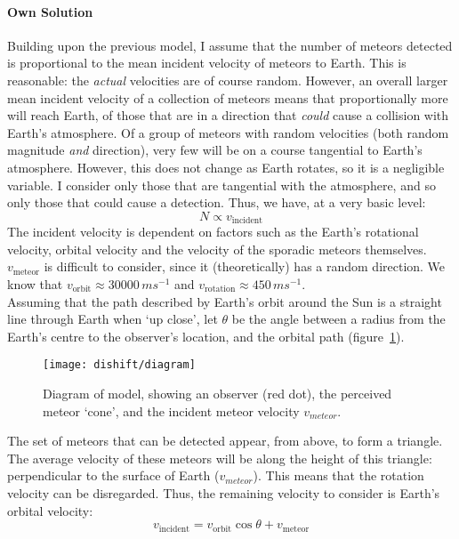 \paragraph{Own Solution\\}
\label{sec:dishift:model}
Building upon the previous model, I assume that the number of meteors detected is proportional to the mean incident velocity of meteors to Earth. This is reasonable: the {\it actual} velocities are of course random. However, an overall larger mean incident velocity of a collection of meteors means that proportionally more will reach Earth, of those that are in a direction that {\it could} cause a collision with Earth's atmosphere. Of a group of meteors with random velocities (both random magnitude {\it and} direction), very few will be on a course tangential to Earth's atmosphere. However, this does not change as Earth rotates, so it is a negligible variable. I consider only those that are tangential with the atmosphere, and so only those that could cause a detection. Thus, we have, at a very basic level:
\begin{equation}
N \propto v_{\text{incident}} 
\end{equation}
The incident velocity is dependent on factors such as the Earth's rotational velocity, orbital velocity and the velocity of the sporadic meteors themselves. $v_{\text{meteor}}$ is difficult to consider, since it (theoretically) has a random direction. We know that $v_{\text{orbit}} \approx 30000 \, ms^{-1}$ and  $v_{\text{rotation}} \approx 450 \, ms^{-1}$.\\
Assuming that the path described by Earth's orbit around the Sun is a straight line through Earth when `up close', let $\theta$ be the angle between a radius from the Earth's centre to the observer's location, and the orbital path (figure~\ref{fig:dishift:ownmodel}). 
\begin{figure}
	\centering
	\texttt{[image: dishift/diagram]}
	\caption{Diagram of model, showing an observer (red dot), the perceived meteor `cone', and the incident meteor velocity $v_{meteor}$.
		\label{fig:dishift:ownmodel}}
\end{figure}The set of meteors that can be detected appear, from above, to form a triangle. The average velocity of these meteors will be along the height of this triangle: perpendicular to the surface of Earth ($v_{meteor}$). This means that the rotation velocity can be disregarded. Thus, the remaining velocity to consider is Earth's orbital velocity:
\begin{equation}
v_{\text{incident}} = v_{\text{orbit}} \cos \theta + v_{\text{meteor}}
\end{equation}

